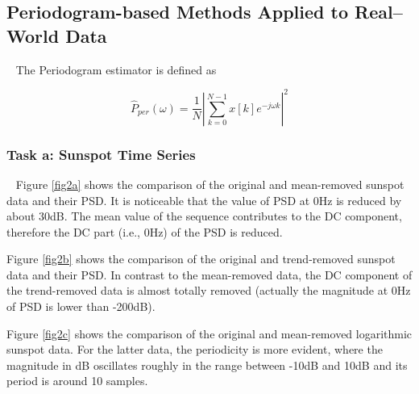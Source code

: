\documentclass[10pt]{article}
\begin{document}
\subsection{Periodogram-based Methods Applied to Real–World Data}
\ \indent
The Periodogram estimator is defined as 

\begin{equation}
	{\hat{P}}_{per}\left(\omega\right)=\frac{1}{N}\left|\sum_{k=0}^{N-1}{x\left[k\right]e^{-j\omega k}}\right|^2 \label{eq9}
\end{equation}

\subsubsection{Task a: Sunspot Time Series}
\ \indent
Figure \ref{fig2a} shows the comparison of the original and mean-removed sunspot 
data and their PSD. It is noticeable that the value of PSD at 0Hz is 
reduced by about 30dB. The mean value of the sequence contributes to 
the DC component, therefore the DC part (i.e., 0Hz) of the PSD is reduced.

Figure \ref{fig2b} shows the comparison of the original and trend-removed sunspot 
data and their PSD. In contrast to the mean-removed data, the DC component 
of the trend-removed data is almost totally removed (actually the 
magnitude at 0Hz of PSD is lower than -200dB).

Figure \ref{fig2c} shows the comparison of the original and mean-removed logarithmic 
sunspot data. For the latter data, the periodicity is more evident, 
where the magnitude in dB oscillates roughly in the range between -10dB 
and 10dB and its period is around 10 samples.
\end{document}
